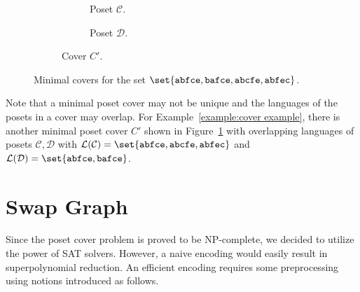 \documentclass[12pt]{llncs}
\DeclarePairedDelimiter\set\{\}
\newcommand{\poset}[1]{\mathcal{#1}}
\newcommand{\lang}[1]{\mathcal{L}(#1)}
\newcommand{\lin}[1]{\texttt{#1}}
\begin{document}
\begin{figure}
\begin{subfigure}[b]{0.5\textwidth}
\begin{subfigure}[b]{0.4\textwidth}
            \caption{Poset $\poset{C}$.}
        \end{subfigure}%
        \begin{subfigure}[b]{0.4\textwidth}
            \centering
            \caption{Poset $\poset{D}$.}
        \end{subfigure}
        \caption{Cover $C'$.}
        \label{figure:cover example c'}
    \end{subfigure}
    \caption{Minimal covers for the set $\set{\lin{abfce},\lin{bafce},\lin{abcfe},\lin{abfec}}$.}
    \label{figure:cover example}
\end{figure}

Note that a minimal poset cover may not be unique and the languages of the posets in a cover may overlap. For Example~\ref{example:cover example}, there is another minimal poset cover $C'$ shown in Figure~\ref{figure:cover example c'} with overlapping languages of posets $\poset{C},\poset{D}$ with ${\lang{\poset{C}} = \set{\lin{abfce},\lin{abcfe},\lin{abfec}}}$ and ${\lang{\poset{D}} = \set{\lin{abfce},\lin{bafce}}}$.

\section{Swap Graph}
Since the poset cover problem is proved to be NP-complete, we decided to utilize the power of SAT solvers. However, a naive encoding would easily result in superpolynomial reduction. An efficient encoding requires some preprocessing using notions introduced as follows.
\end{document}
